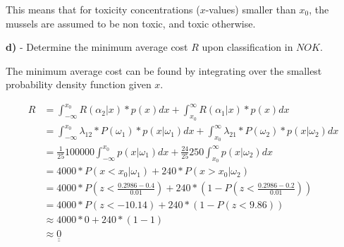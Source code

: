 \documentclass{homeworg}
\begin{document}


This means that for toxicity concentrations ($x$-values) smaller than $x_0$, the mussels are assumed to be non toxic, and toxic otherwise.


\bigskip
\textbf{d)} - Determine the minimum average cost $R$ upon classification in $NOK$.
\smallskip

The minimum average cost can be found by integrating over the smallest probability density function given $x$.

\begin{equation}
    \begin{aligned}
        R 
        &= \int_{-\infty}^{x_0}R(\alpha_2|x)*p(x)dx + \int_{x_0}^{\infty}R(\alpha_1|x)*p(x)dx \\
        &= \int_{-\infty}^{x_0}\lambda_{12}*P(\omega_1)*p(x|\omega_1)dx + \int_{x_0}^{\infty}\lambda_{21}*P(\omega_2)*p(x|\omega_2)dx \\
        &= \frac{1}{25}100000\int_{-\infty}^{x_0}p(x|\omega_1)dx + \frac{24}{25}250\int_{x_0}^{\infty}p(x|\omega_2)dx \\
        &= 4000 * P(x < x_0|\omega_1) + 240 * P(x > x_0|\omega_2) \\
        &= 4000 * P\left(z < \frac{0.2986-0.4}{0.01}\right) + 240 * \left(1 - P\left(z < \frac{0.2986-0.2}{0.01}\right)\right) \\
        &= 4000 * P(z < -10.14) + 240 * \left(1-P(z < 9.86)\right) \\
        &\approx 4000 * 0 + 240 * (1-1) \\
        &\approx \underline{\underline{0}}
    \end{aligned}
\end{equation}
\end{document}
